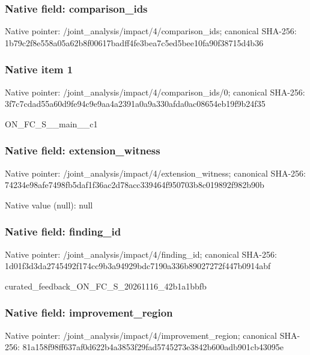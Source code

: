 \documentclass[10pt,a4paper]{article}
\begin{document}
\subsubsection{Native field: comparison\_\allowbreak{}ids}
Native pointer: /joint\_\allowbreak{}analysis/impact/4/comparison\_\allowbreak{}ids; canonical SHA-256: 1b79c2f8e558a05a62b8f00617badff4fe3bea7c5ed5bee10fa90f38715d4b36

\subsubsection{Native item 1}
Native pointer: /joint\_\allowbreak{}analysis/impact/4/comparison\_\allowbreak{}ids/0; canonical SHA-256: 3f7c7cdad55a60d9fe94c9e9aa4a2391a0a9a330afda0ac08654eb19f9b24f35

\begingroup\raggedright\sloppy ON\_\allowbreak{}FC\_\allowbreak{}S\_\allowbreak{}\_\allowbreak{}main\_\allowbreak{}\_\allowbreak{}c1\par\endgroup

\subsubsection{Native field: extension\_\allowbreak{}witness}
Native pointer: /joint\_\allowbreak{}analysis/impact/4/extension\_\allowbreak{}witness; canonical SHA-256: 74234e98afe7498fb5daf1f36ac2d78acc339464f950703b8c019892f982b90b

Native value (null): null

\subsubsection{Native field: finding\_\allowbreak{}id}
Native pointer: /joint\_\allowbreak{}analysis/impact/4/finding\_\allowbreak{}id; canonical SHA-256: 1d01f3d3da2745492f174cc9b3a94929bdc7190a336b89027272f447b0914abf

\begingroup\raggedright\sloppy curated\_\allowbreak{}feedback\_\allowbreak{}ON\_\allowbreak{}FC\_\allowbreak{}S\_\allowbreak{}20261116\_\allowbreak{}42b1a1bbfb\par\endgroup

\subsubsection{Native field: improvement\_\allowbreak{}region}
Native pointer: /joint\_\allowbreak{}analysis/impact/4/improvement\_\allowbreak{}region; canonical SHA-256: 81a158f98ff637af0d622b4a3853f29fad5745273e3842b600adb901cb43095e
\end{document}
